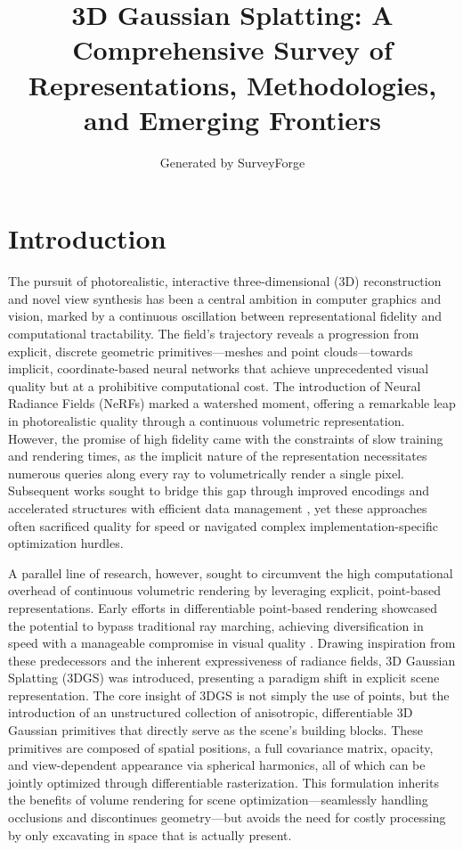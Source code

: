 \documentclass[11pt,a4paper]{article}
\title{3D Gaussian Splatting: A Comprehensive Survey of Representations, Methodologies, and Emerging Frontiers}
\author{Generated by SurveyForge}
\date{}
\begin{document}
\maketitle
\tableofcontents
\newpage



\section{Introduction}


The pursuit of photorealistic, interactive three-dimensional (3D) reconstruction and novel view synthesis has been a central ambition in computer graphics and vision, marked by a continuous oscillation between representational fidelity and computational tractability. The field's trajectory reveals a progression from explicit, discrete geometric primitives---meshes and point clouds---towards implicit, coordinate-based neural networks that achieve unprecedented visual quality but at a prohibitive computational cost. The introduction of Neural Radiance Fields (NeRFs) marked a watershed moment, offering a remarkable leap in photorealistic quality through a continuous volumetric representation. However, the promise of high fidelity came with the constraints of slow training and rendering times, as the implicit nature of the representation necessitates numerous queries along every ray to volumetrically render a single pixel. Subsequent works sought to bridge this gap through improved encodings \cite{arxiv:2112.05131v1,arxiv:2205.10824v2} and accelerated structures with efficient data management \cite{arxiv:2103.14024v2,arxiv:2202.08614v2}, yet these approaches often sacrificed quality for speed or navigated complex implementation-specific optimization hurdles.

A parallel line of research, however, sought to circumvent the high computational overhead of continuous volumetric rendering by leveraging explicit, point-based representations. Early efforts in differentiable point-based rendering showcased the potential to bypass traditional ray marching, achieving diversification in speed with a manageable compromise in visual quality \cite{arxiv:2004.07484v3,arxiv:2205.14330v4}. Drawing inspiration from these predecessors and the inherent expressiveness of radiance fields, 3D Gaussian Splatting (3DGS) \cite{arxiv:2308.04079v1} was introduced, presenting a paradigm shift in explicit scene representation. The core insight of 3DGS is not simply the use of points, but the introduction of an unstructured collection of anisotropic, differentiable 3D Gaussian primitives that directly serve as the scene's building blocks. These primitives are composed of spatial positions, a full covariance matrix, opacity, and view-dependent appearance via spherical harmonics, all of which can be jointly optimized through differentiable rasterization. This formulation inherits the benefits of volume rendering for scene optimization---seamlessly handling occlusions and discontinues geometry---but avoids the need for costly processing by only excavating in space that is actually present.
\end{document}
